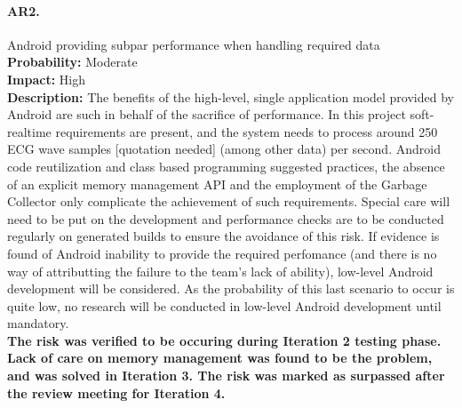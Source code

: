 		\paragraph{AR2.}Android providing subpar performance when handling required data\\
		\textbf{Probability:} Moderate\\
		\textbf{Impact:} High\\
		\textbf{Description:} The benefits of the high-level, single application model provided by Android are such in behalf of the sacrifice of performance. In this project soft-realtime requirements are present, and the system needs to process around 250 ECG wave samples [quotation needed] (among other data) per second. Android code reutilization and class based programming suggested practices, the absence of an explicit memory management API and the employment of the Garbage Collector only complicate the achievement of such requirements.  
		Special care will need to be put on the development and performance checks are to be conducted regularly on generated builds to ensure the avoidance of this risk.
		If evidence is found of Android inability to provide the required perfomance (and there is no way of attributting the failure to the team's lack of ability), low-level Android development will be considered. As the probability of this last scenario to occur is quite low, no research will be conducted in low-level Android development until mandatory.\\
		\textbf{The risk was verified to be occuring during Iteration 2 testing phase. Lack of care on memory management was found to be the problem, and was solved in Iteration 3. The risk was marked as surpassed after the review meeting for Iteration 4.}

